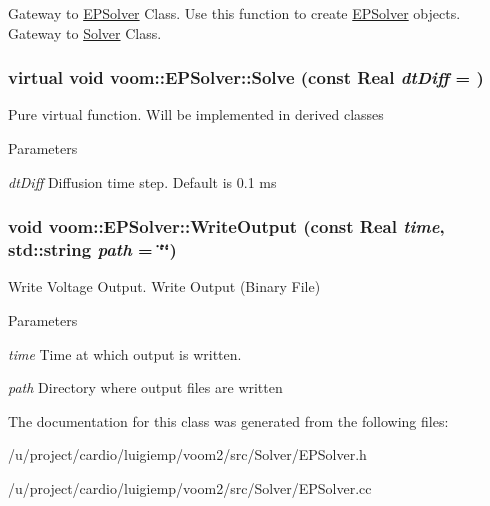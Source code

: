 Gateway to \hyperlink{classvoom_1_1_e_p_solver}{EPSolver} Class. Use this function to create \hyperlink{classvoom_1_1_e_p_solver}{EPSolver} objects. Gateway to \hyperlink{classvoom_1_1_solver}{Solver} Class. \hypertarget{classvoom_1_1_e_p_solver_a4eedcdb113d7c15df7b23dd69dc46e0e}{
\subsubsection[{Solve}]{\setlength{\rightskip}{0pt plus 5cm}virtual void voom::EPSolver::Solve (const Real {\em dtDiff} = {})}}
\label{classvoom_1_1_e_p_solver_a4eedcdb113d7c15df7b23dd69dc46e0e}
Pure virtual function. Will be implemented in derived classes 
\begin{DoxyParams}{Parameters}
\item[{\em dtDiff}]Diffusion time step. Default is 0.1 ms \end{DoxyParams}
\hypertarget{classvoom_1_1_e_p_solver_a22722e9e010bbf7f3eff3bddfac65d26}{
\subsubsection[{WriteOutput}]{\setlength{\rightskip}{0pt plus 5cm}void voom::EPSolver::WriteOutput (const Real {\em time}, \/  std::string {\em path} = {\ttfamily \char`\"{}\char`\"{}})}}
\label{classvoom_1_1_e_p_solver_a22722e9e010bbf7f3eff3bddfac65d26}


Write Voltage Output. Write Output (Binary File) 
\begin{DoxyParams}{Parameters}
\item[{\em time}]Time at which output is written. \item[{\em path}]Directory where output files are written \end{DoxyParams}


The documentation for this class was generated from the following files:\begin{DoxyCompactItemize}
\item 
/u/project/cardio/luigiemp/voom2/src/Solver/EPSolver.h\item 
/u/project/cardio/luigiemp/voom2/src/Solver/EPSolver.cc\end{DoxyCompactItemize}
